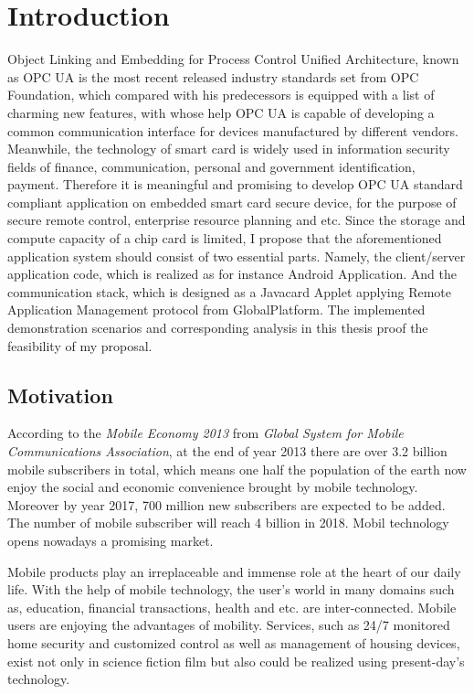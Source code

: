 \chapter{Introduction}\label{secIntroduction}

Object Linking and Embedding for Process Control Unified Architecture, known as OPC UA is the most recent released industry standards set from OPC Foundation, which compared with his predecessors is equipped with a list of charming new features, with whose help OPC UA is capable of developing a common communication interface for devices manufactured by different vendors. Meanwhile, the technology of smart card is widely used in information security fields of finance, communication, personal and government identification, payment. Therefore it is meaningful and promising to develop OPC UA standard compliant application on embedded smart card secure device, for the purpose of secure remote control, enterprise resource planning and etc. Since the storage and compute capacity of a chip card is limited, I propose that the aforementioned application system should consist of two essential parts. Namely, the client/server application code, which is realized as for instance Android Application. And the communication stack, which is designed as a Javacard Applet applying Remote Application Management protocol from GlobalPlatform. The implemented demonstration scenarios and corresponding analysis in this thesis proof the feasibility of my proposal. 

\section{Motivation}\label{secMotivation}

According to the \emph{Mobile Economy 2013} from \emph{Global System for Mobile Communications Association}, at the end of year 2013 there are over 3.2 billion mobile   subscribers in total, which means one half the population of the earth now enjoy the social and economic convenience brought by mobile technology. Moreover by year 2017, 700 million new subscribers are expected to be added. The number of mobile subscriber will reach 4 billion in 2018. Mobil technology opens nowadays a promising market.

Mobile products play an irreplaceable and immense role at the heart of our daily life. With the help of mobile technology, the user's world in many domains such as, education, financial transactions, health and etc. are inter-connected. Mobile users are enjoying the advantages of mobility. Services, such as 24/7 monitored home security and customized control as well as management of housing devices, exist not only in science fiction film but also could be realized using present-day's technology.


